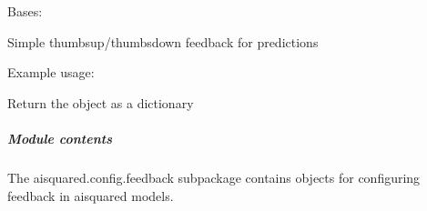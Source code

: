 \documentclass[letterpaper,10pt,english]{sphinxmanual}
\begin{document}
\begin{fulllineitems}
\label{\detokenize{aisquared.config.feedback:aisquared.config.feedback.SimpleFeedback.SimpleFeedback}}
\pysigstartsignatures
{}
\pysigstopsignatures
\sphinxAtStartPar
Bases: {\hyperref[\detokenize{aisquared.base:aisquared.base.BaseObject.BaseObject}]{}}

\sphinxAtStartPar
Simple thumbs\sphinxhyphen{}up/thumbs\sphinxhyphen{}down feedback for predictions

\sphinxAtStartPar
Example usage:

\begin{sphinxVerbatim}[commandchars=\\\{\}]
 
  
\end{sphinxVerbatim}

\begin{fulllineitems}
\label{\detokenize{aisquared.config.feedback:aisquared.config.feedback.SimpleFeedback.SimpleFeedback.to_dict}}
\pysigstartsignatures
{}
\pysigstopsignatures
\sphinxAtStartPar
Return the object as a dictionary

\end{fulllineitems}


\end{fulllineitems}



\subparagraph{Module contents}
\label{\detokenize{aisquared.config.feedback:module-aisquared.config.feedback}}\label{\detokenize{aisquared.config.feedback:module-contents}}
\sphinxAtStartPar
The aisquared.config.feedback subpackage contains objects for configuring feedback in aisquared models.
\end{document}
